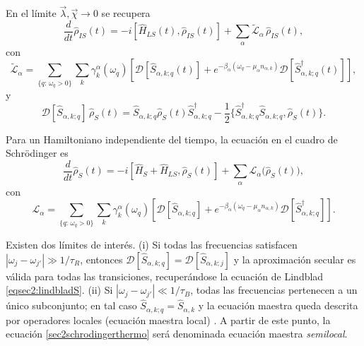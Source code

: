 En el límite \(\vec{\lambda},\vec{\chi}\to 0\) se recupera
\begin{equation*}
    \frac{d}{dt}\hat{\rho}_{IS}(t) 
    = - i[\hat{H}_{LS}(t),\hat{\rho}_{IS}(t)] 
      + \sum_{\alpha}\tilde{\mathcal{L}}_{\alpha}\,\hat{\rho}_{IS}(t),
\end{equation*}
con
\begin{equation*}
    \tilde{\mathcal{L}}_{\alpha} 
    = \sum_{\{q:\,\omega_{q}>0\}} \sum_{k}\gamma^{\alpha}_{k}(\omega_{q})
      \left[
        \mathcal{D}[\hat{S}_{\alpha,k;q}(t)]
        + e^{-\beta_{\alpha}(\omega_{q}-\mu_{\alpha}n_{\alpha,k})}
          \mathcal{D}[\hat{S}^{\dagger}_{\alpha,k;q}(t)]
      \right],
\end{equation*}
y
\begin{equation*}
    \mathcal{D}[\hat{S}_{\alpha,k;q}]\,\hat{\rho}_{S}(t)
    = \hat{S}_{\alpha,k;q}\hat{\rho}_{S}(t)\hat{S}^{\dagger}_{\alpha,k;q}
      - \frac{1}{2}\{\hat{S}^{\dagger}_{\alpha,k;q}\hat{S}_{\alpha,k;q},\hat{\rho}_{S}(t)\}.
\end{equation*}

Para un Hamiltoniano independiente del tiempo, la ecuación en el cuadro de Schrödinger es
\begin{equation}
    \frac{d}{dt}\hat{\rho}_{S}(t) 
    = -i [\hat{H}_{S}+ \hat{H}_{LS},\hat{\rho}_{S}(t)]
      + \sum_{\alpha}\mathcal{L}_{\alpha}\big(\hat{\rho}_{S}(t)\big),
    \label{sec2schrodingerthermo}
\end{equation}
con
\begin{equation}
    \mathcal{L}_{\alpha} 
    = \sum_{\{q:\,\omega_{q}>0\}} \sum_{k}\gamma^{\alpha}_{k}(\omega_{q})
      \left[
        \mathcal{D}[\hat{S}_{\alpha,k;q}]
        + e^{-\beta_{\alpha}(\omega_{q}-\mu_{\alpha}n_{\alpha,k})}
          \mathcal{D}[\hat{S}^{\dagger}_{\alpha,k;q}]
      \right].
    \label{sec2lindbladconsistency}
\end{equation}

Existen dos límites de interés. (i) Si todas las frecuencias satisfacen 
\(|\omega_{j}-\omega_{j'}|\gg 1/\tau_{R}\),
entonces \(\mathcal{D}[\hat{S}_{\alpha,k;q}]=\mathcal{D}[\hat{S}_{\alpha,k;j}]\) y la aproximación secular es válida para todas las transiciones, recuperándose la ecuación de Lindblad \eqref{eqsec2:lindbladS}. (ii) Si 
\(|\omega_{j}-\omega_{j'}|\ll 1/\tau_{B}\),
todas las frecuencias pertenecen a un único subconjunto; en tal caso \(\hat{S}_{\alpha,k;q}=\hat{S}_{\alpha,k}\) y la ecuación maestra queda descrita por operadores locales (ecuación maestra local) \cite{wichterich2007modeling}. A partir de este punto, la ecuación \eqref{sec2schrodingerthermo} será denominada ecuación maestra \textit{semilocal}.



